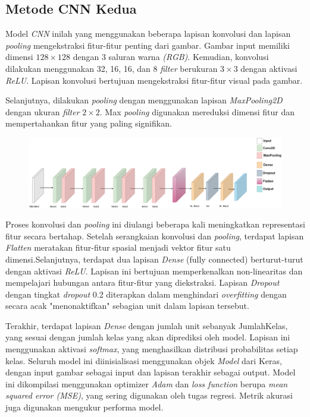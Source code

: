 \subsection{Metode CNN Kedua}
Model \textit{CNN} inilah yang menggunakan beberapa lapisan konvolusi dan lapisan \textit{pooling} mengekstraksi fitur-fitur penting dari gambar. Gambar input memiliki dimensi $128 \times 128$ dengan 3 saluran warna \textit{(RGB)}. Kemudian, konvolusi dilakukan menggunakan 32, 16, 16, dan 8 \textit{filter} berukuran $3 \times 3$ dengan aktivasi \textit{ReLU}. Lapisan konvolusi bertujuan mengekstraksi fitur-fitur visual pada gambar.

Selanjutnya, dilakukan \textit{pooling} dengan menggunakan lapisan \textit{MaxPooling2D} dengan ukuran \textit{filter} $2 \times 2$. Max \textit{pooling} digunakan mereduksi dimensi fitur dan mempertahankan fitur yang paling signifikan.

\begin{figure}[hbt!]
	\includegraphics[width=1.0\linewidth]{gambar/bener/Arsitektur_CNN2_Revisi.png}
	\label{fig:layerCNN}
\end{figure}

Proses konvolusi dan \textit{pooling} ini diulangi beberapa kali meningkatkan representasi fitur secara bertahap. Setelah serangkaian konvolusi dan \textit{pooling}, terdapat lapisan \textit{Flatten} meratakan fitur-fitur spasial menjadi vektor fitur satu dimensi.Selanjutnya, terdapat dua lapisan \textit{Dense} (fully connected) berturut-turut dengan aktivasi \textit{ReLU}. Lapisan ini bertujuan memperkenalkan non-linearitas dan mempelajari hubungan antara fitur-fitur yang diekstraksi. Lapisan \textit{Dropout} dengan tingkat \textit{dropout} 0.2 diterapkan dalam menghindari \textit{overfitting} dengan secara acak "menonaktifkan" sebagian unit dalam lapisan tersebut.

Terakhir, terdapat lapisan \textit{Dense} dengan jumlah unit sebanyak JumlahKelas, yang sesuai dengan jumlah kelas yang akan diprediksi oleh model. Lapisan ini menggunakan aktivasi \textit{softmax}, yang menghasilkan distribusi probabilitas setiap kelas. Seluruh model ini diinisialisasi menggunakan objek \textit{Model} dari Keras, dengan input gambar sebagai input dan lapisan terakhir sebagai output. Model ini dikompilasi menggunakan optimizer \textit{Adam} dan \textit{loss function} berupa \textit{mean squared error (MSE)}, yang sering digunakan oleh tugas regresi. Metrik akurasi juga digunakan mengukur performa model.


